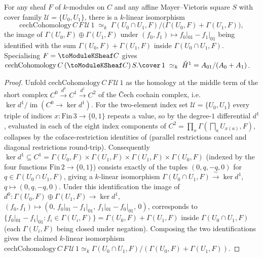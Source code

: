 \begin{proposition}
  \label{thm:adelic_cechH1_eq_cokernel}
  \leanok
  For any sheaf \(F\) of \(k\)-modules on \(C\) and any affine
  Mayer--Vietoris square \(S\) with cover family \(\mathcal U = \{U_0,
  U_1\}\), there is a \(k\)-linear isomorphism
  \[
    \mathrm{cechCohomology}\, C\, F\, \mathcal U\, 1
    \;\simeq_k\; \Gamma(U_0 \cap U_1, F) \big/
      \bigl(\Gamma(U_0, F) + \Gamma(U_1, F)\bigr),
  \]
  the image of \(\Gamma(U_0, F) \oplus \Gamma(U_1, F)\) under
  \((f_0, f_1) \mapsto f_0|_{01} - f_1|_{01}\) being identified with the
  sum \(\Gamma(U_0, F) + \Gamma(U_1, F)\) inside \(\Gamma(U_0 \cap U_1,
  F)\). Specialising \(F = \toModuleKSheaf C\) gives
  \(\mathrm{cechCohomology}\, C\, (\toModuleKSheaf C)\, S.\cover\, 1
  \;\simeq_k\; \check{H}^1 = A_{01}/(A_0 + A_1)\).
\end{proposition}
\begin{proof}
  \leanok
  Unfold \(\mathrm{cechCohomology}\, C\, F\, \mathcal U\, 1\) as the
  homology at the middle term of the short complex
  \(C^0 \xrightarrow{d^0} C^1 \xrightarrow{d^1} C^2\) of the Čech
  cochain complex, i.e.\ \(\ker d^1 / \operatorname{im}(C^0 \to \ker
  d^1)\). For the two-element index set \(\mathcal U = \{U_0, U_1\}\)
  every triple of indices \(x \colon \mathrm{Fin}\,3 \to \{0,1\}\)
  repeats a value, so by  the
  degree-\(1\) differential \(d^1\), evaluated in each of the eight
  index components of \(C^2 = \prod_x \Gamma(\bigsqcap_a
  U_{x(a)}, F)\), collapses by the coface-restriction identities of
   (parallel restrictions
  cancel and diagonal restrictions round-trip). Consequently
  \(\ker d^1 \subseteq C^1 = \Gamma(U_0, F) \times \Gamma(U_1, F) \times
  \Gamma(U_1, F) \times \Gamma(U_0, F)\) (indexed by the four functions
  \(\mathrm{Fin}\,2 \to \{0,1\}\)) consists exactly of the tuples
  \((0, q, -q, 0)\) for \(q \in \Gamma(U_0 \cap U_1, F)\), giving a
  \(k\)-linear isomorphism \(\Gamma(U_0 \cap U_1, F) \xrightarrow{\ \sim\
  } \ker d^1\), \(q \mapsto (0, q, -q, 0)\). Under this identification
  the image of \(d^0 \colon \Gamma(U_0, F) \oplus \Gamma(U_1, F) \to
  \ker d^1\), \((f_0, f_1) \mapsto (0,\, f_0|_{01} - f_1|_{01},\,
  f_1|_{01} - f_0|_{01},\, 0)\), corresponds to \(\{ f_0|_{01} -
  f_1|_{01} : f_i \in \Gamma(U_i, F)\} = \Gamma(U_0, F) + \Gamma(U_1,
  F)\) inside \(\Gamma(U_0 \cap U_1, F)\) (each \(\Gamma(U_i, F)\) being
  closed under negation). Composing the two identifications gives the
  claimed \(k\)-linear isomorphism
  \(\mathrm{cechCohomology}\, C\, F\, \mathcal U\, 1 \simeq_k
  \Gamma(U_0 \cap U_1, F)/(\Gamma(U_0, F) + \Gamma(U_1, F))\).
\end{proof}

